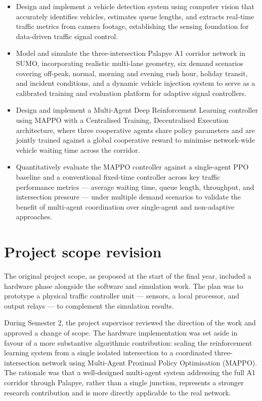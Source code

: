 \documentclass[11pt, a4paper]{report}
\begin{document}
\begin{itemize}
    \item Design and implement a vehicle detection system using computer vision that accurately identifies vehicles, estimates queue lengths, and extracts real-time traffic metrics from camera footage, establishing the sensing foundation for data-driven traffic signal control.
    \item Model and simulate the three-intersection Palapye A1 corridor network in SUMO, incorporating realistic multi-lane geometry, six demand scenarios covering off-peak, normal, morning and evening rush hour, holiday transit, and incident conditions, and a dynamic vehicle injection system to serve as a calibrated training and evaluation platform for adaptive signal controllers.
    \item Design and implement a Multi-Agent Deep Reinforcement Learning controller using MAPPO with a Centralised Training, Decentralised Execution architecture, where three cooperative agents share policy parameters and are jointly trained against a global cooperative reward to minimise network-wide vehicle waiting time across the corridor.
    \item Quantitatively evaluate the MAPPO controller against a single-agent PPO baseline and a conventional fixed-time controller across key traffic performance metrics --- average waiting time, queue length, throughput, and intersection pressure --- under multiple demand scenarios to validate the benefit of multi-agent coordination over single-agent and non-adaptive approaches.
\end{itemize}

\section{Project scope revision}

The original project scope, as proposed at the start of the final year, included a hardware phase alongside the software and simulation work. The plan was to prototype a physical traffic controller unit --- sensors, a local processor, and output relays --- to complement the simulation results.

During Semester 2, the project supervisor reviewed the direction of the work and approved a change of scope. The hardware implementation was set aside in favour of a more substantive algorithmic contribution: scaling the reinforcement learning system from a single isolated intersection to a coordinated three-intersection network using Multi-Agent Proximal Policy Optimisation (MAPPO). The rationale was that a well-designed multi-agent system addressing the full A1 corridor through Palapye, rather than a single junction, represents a stronger research contribution and is more directly applicable to the real network.
\end{document}
